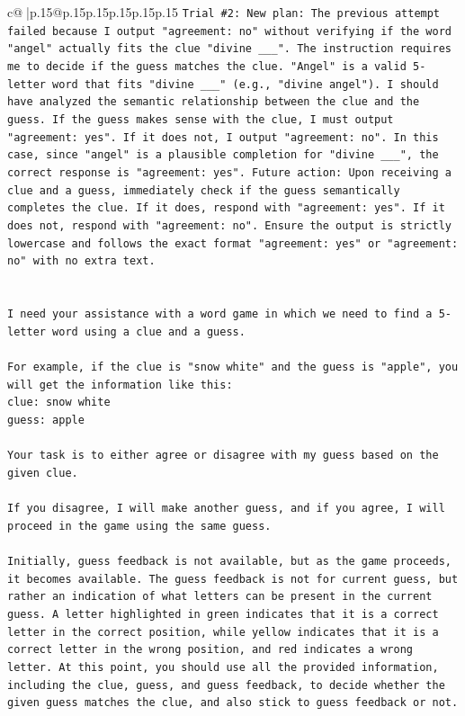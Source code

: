 \documentclass{article}
\begin{document}
{\begin{supertabular}{c@{$\;$}|p{.15\linewidth}@{}p{.15\linewidth}p{.15\linewidth}p{.15\linewidth}p{.15\linewidth}p{.15\linewidth}}
{{{\texttt{Trial \#2: New plan: The previous attempt failed because I output "agreement: no" without verifying if the word "angel" actually fits the clue "divine \_\_\_". The instruction requires me to decide if the guess matches the clue. "Angel" is a valid 5{-}letter word that fits "divine \_\_\_" (e.g., "divine angel"). I should have analyzed the semantic relationship between the clue and the guess. If the guess makes sense with the clue, I must output "agreement: yes". If it does not, I output "agreement: no". In this case, since "angel" is a plausible completion for "divine \_\_\_", the correct response is "agreement: yes". Future action: Upon receiving a clue and a guess, immediately check if the guess semantically completes the clue. If it does, respond with "agreement: yes". If it does not, respond with "agreement: no". Ensure the output is strictly lowercase and follows the exact format "agreement: yes" or "agreement: no" with no extra text.} \\
\\ 
\\ 
\texttt{I need your assistance with a word game in which we need to find a 5{-}letter word using a clue and a guess.} \\
\\ 
\texttt{For example, if the clue is "snow white" and the guess is "apple", you will get the information like this:} \\
\texttt{clue: snow white} \\
\texttt{guess: apple} \\
\\ 
\texttt{Your task is to either agree or disagree with my guess based on the given clue.} \\
\\ 
\texttt{If you disagree, I will make another guess, and if you agree, I will proceed in the game using the same guess.} \\
\\ 
\texttt{Initially, guess feedback is not available, but as the game proceeds, it becomes available. The guess feedback is not for current guess, but rather an indication of what letters can be present in the current guess. A letter highlighted in green indicates that it is a correct letter in the correct position, while yellow indicates that it is a correct letter in the wrong position, and red indicates a wrong letter. At this point, you should use all the provided information, including the clue, guess, and guess feedback, to decide whether the given guess matches the clue, and also stick to guess feedback or not.} \\
}}}
\end{supertabular}}
\end{document}
